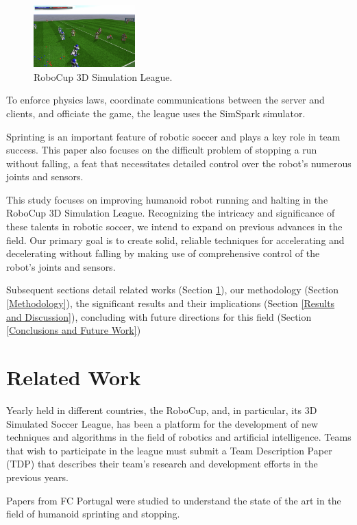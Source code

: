 \documentclass[conference]{IEEEtran}
\begin{document}
\begin{figure}[htbp]
    \centerline{\includegraphics[width=0.35\textwidth]{images/robocup3d.png}}
    \caption{RoboCup 3D Simulation League.}
    \label{fig:robocup3d}
\end{figure}

To enforce physics laws, coordinate communications between the server and clients, and officiate the game, the league uses the SimSpark simulator.

Sprinting is an important feature of robotic soccer and plays a key role in team success. This paper also focuses on the difficult problem of stopping a run without falling, a feat that necessitates detailed control over the robot's numerous joints and sensors.

This study focuses on improving humanoid robot running and halting in the RoboCup 3D Simulation League.
Recognizing the intricacy and significance of these talents in robotic soccer, we intend to expand on previous advances in the field.
Our primary goal is to create solid, reliable techniques for accelerating and decelerating without falling by making use of comprehensive control
of the robot's joints and sensors.

Subsequent sections detail related works (Section \ref{Related Work}), our methodology (Section \ref{Methodology}),
the significant results and their implications (Section \ref{Results and Discussion}),
concluding with future directions for this field (Section \ref{Conclusions and Future Work})

\section{Related Work}\label{Related Work}

Yearly held in different countries, the RoboCup, and, in particular, its 3D Simulated Soccer League, has been a platform for the development of new techniques and algorithms in the field of robotics and artificial intelligence.
Teams that wish to participate in the league must submit a Team Description Paper (TDP) that describes their team's research and development efforts in the previous years.

Papers from FC Portugal were studied to understand the state of the art in the field of humanoid sprinting and stopping.
\end{document}
